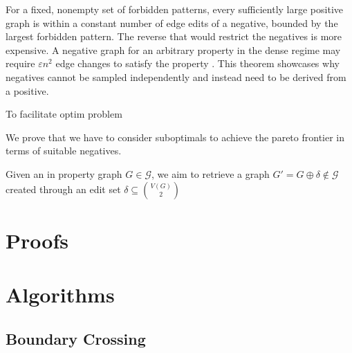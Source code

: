\documentclass[11pt,twocolumn]{article}
\begin{document}
For a fixed, nonempty set of forbidden patterns, every sufficiently large positive graph is within a constant number of edge edits of a negative, bounded by the largest forbidden pattern.
The reverse that would restrict the negatives is more expensive.
A negative graph for an arbitrary property in the dense regime may require $\varepsilon n^2$ edge changes to satisfy the property \cite{shapiraTestingEstimationGraph2024, martinEditDistanceFunction2013}.
This theorem showcases why negatives cannot be sampled independently and instead need to be derived from a positive.





To facilitate optim problem

We prove that we have to consider suboptimals to achieve the pareto frontier in terms of suitable negatives.


Given an in property graph $G \in \mathcal{G}$, we aim to retrieve a graph $G' = G \oplus \delta \not\in \mathcal{G}$ created through an edit set $\delta \subseteq \binom{V(G)}{2}$




\printbibliography

\appendix

\section{Proofs}\label{app:proofs}

\section{Algorithms}

\subsection{Boundary Crossing}
\end{document}
